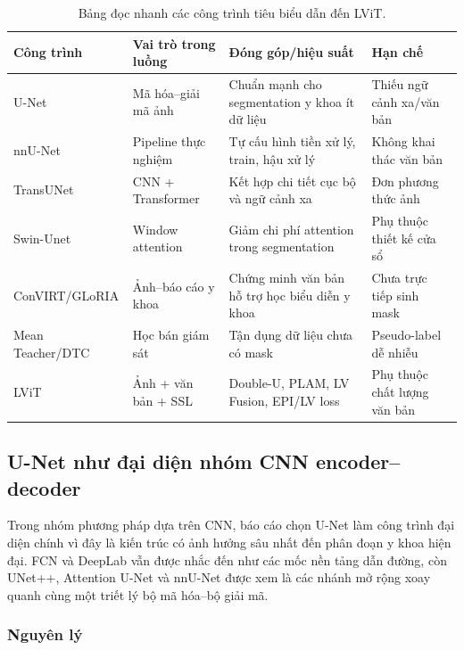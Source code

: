 \begin{table}[!t]
  \centering
  \caption{Bảng đọc nhanh các công trình tiêu biểu dẫn đến LViT.}
  \label{tab:sota-quick-map}
  \scriptsize
  \renewcommand{\arraystretch}{1.15}
  \setlength{\tabcolsep}{5pt}
  \begin{tabularx}{\textwidth}{@{}l L L L@{}}
    \toprule
    Công trình & Vai trò trong luồng & Đóng góp/hiệu suất & Hạn chế \\ 
    \midrule
    U-Net \cite{ronneberger2015unet} & Mã hóa--giải mã ảnh & Chuẩn mạnh cho segmentation y khoa ít dữ liệu & Thiếu ngữ cảnh xa/văn bản \\
    nnU-Net \cite{isensee2021nnunet} & Pipeline thực nghiệm & Tự cấu hình tiền xử lý, train, hậu xử lý & Không khai thác văn bản \\
    TransUNet \cite{chen2021transunet} & CNN + Transformer & Kết hợp chi tiết cục bộ và ngữ cảnh xa & Đơn phương thức ảnh \\
    Swin-Unet \cite{cao2021swinunet} & Window attention & Giảm chi phí attention trong segmentation & Phụ thuộc thiết kế cửa sổ \\
    ConVIRT/GLoRIA \cite{zhang2020convirt,huang2021gloria} & Ảnh--báo cáo y khoa & Chứng minh văn bản hỗ trợ học biểu diễn y khoa & Chưa trực tiếp sinh mask \\
    Mean Teacher/DTC \cite{tarvainen2017meanteacher,luo2021dtc} & Học bán giám sát & Tận dụng dữ liệu chưa có mask & Pseudo-label dễ nhiễu \\
    LViT \cite{li2023lvit} & Ảnh + văn bản + SSL & Double-U, PLAM, LV Fusion, EPI/LV loss & Phụ thuộc chất lượng văn bản \\
    \bottomrule
  \end{tabularx}
\end{table}
\FloatBarrier

\subsection{U-Net như đại diện nhóm CNN encoder--decoder}

Trong nhóm phương pháp dựa trên CNN, báo cáo chọn U-Net làm công trình đại diện chính vì đây là kiến trúc có ảnh hưởng sâu nhất đến phân đoạn y khoa hiện đại. FCN và DeepLab vẫn được nhắc đến như các mốc nền tảng dẫn đường, còn UNet++, Attention U-Net và nnU-Net được xem là các nhánh mở rộng xoay quanh cùng một triết lý bộ mã hóa--bộ giải mã.

\subsubsection{Nguyên lý}

